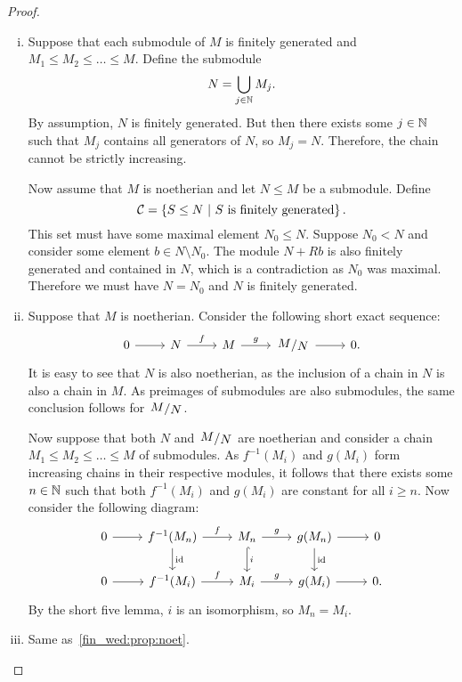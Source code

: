 \begin{proof}
\phantom{a}
\begin{enumerate}[i)]
\item Suppose that each submodule of $M$ is finitely generated and
$M_1 \leq M_2 \leq \dots \leq M$. Define the submodule
\[
N = \bigcup_{j \in \mathbb{N}} M_j.
\]
By assumption, $N$ is finitely generated. But then there exists
some $j \in \mathbb{N}$ such that $M_j$ contains all generators of $N$,
so $M_j = N$. Therefore, the chain cannot be strictly increasing.

Now assume that $M$ is noetherian and let $N \leq M$ be a
submodule. Define
\[
\mathcal{C} = \left\{S \leq N~\middle\vert~\text{$S$ is finitely generated}\right\}.
\]
This set must have some maximal element $N_0 \leq N$. Suppose
$N_0 < N$ and consider some element $b \in N \setminus N_0$. The
module $N + Rb$ is also finitely generated and contained in $N$,
which is a contradiction as $N_0$ was maximal. Therefore we must
have $N = N_0$ and $N$ is finitely generated.

\item Suppose that $M$ is noetherian. Consider the following short
exact sequence:
\[
\begin{tikzcd}
0 \arrow[r] & N \arrow[r, "f"] &
M \arrow[r, "g"] & \kvoc{M}{N} \arrow[r] & 0.
\end{tikzcd}
\]
It is easy to see that $N$ is also noetherian, as the inclusion of
a chain in $N$ is also a chain in $M$. As preimages of submodules
are also submodules, the same conclusion follows for $\kvoc{M}{N}$.

Now suppose that both $N$ and $\kvoc{M}{N}$ are noetherian and
consider a chain $M_1 \leq M_2 \leq \dots \leq M$ of submodules.
As $f^{-1}(M_i)$ and $g(M_i)$ form increasing chains in their
respective modules, it follows that there exists some $n \in \mathbb{N}$
such that both $f^{-1}(M_i)$ and $g(M_i)$ are constant for all
$i \geq n$. Now consider the following diagram:
\[
\begin{tikzcd}
0 \arrow[r] &
f^{-1}(M_n) \arrow[r, "f"] \arrow[d, "\id"] &
M_n \arrow[r, "g"] \arrow[d, hook, "i"] &
g(M_n) \arrow[r] \arrow[d, "\id"] &
0 \\
0 \arrow[r] &
f^{-1}(M_i) \arrow[r, "f"] &
M_i \arrow[r, "g"] &
g(M_i) \arrow[r] &
0.
\end{tikzcd}
\]
By the short five lemma, $i$ is an isomorphism, so $M_n = M_i$.
\item Same as~\ref{fin_wed:prop:noet}. \qedhere
\end{enumerate}
\end{proof}

